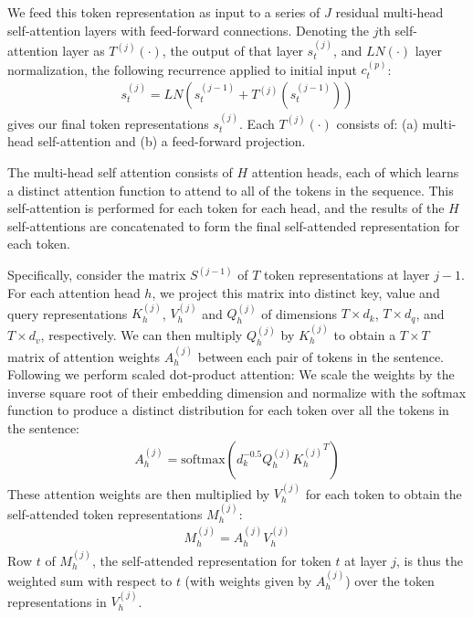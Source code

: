 \documentclass[11pt,a4paper]{article}
\begin{document}
We feed this token representation as input to a series of $J$ residual multi-head self-attention layers with feed-forward connections. Denoting the $j$th self-attention layer as $T^{(j)}(\cdot)$, the output of that layer $s_t^{(j)}$, and $LN(\cdot)$ layer normalization, the following recurrence applied to initial input $c_t^{(p)}$:
\begin{align}
\label{eqn:overall}
s_t^{(j)} = LN(s_t^{(j-1)} + T^{(j)}(s_t^{(j-1)}))
\end{align}
gives our final token representations $s_t^{(j)}$. Each $T^{(j)}(\cdot)$ consists of: (a) multi-head self-attention and (b) a feed-forward projection.

The multi-head self attention consists of $H$ attention heads, each of which learns a distinct attention function to attend to all of the tokens in the sequence. This self-attention is performed for each token for each head, and the results of the $H$ self-attentions are concatenated to form the final self-attended representation for each token. 

Specifically, consider the matrix $S^{(j-1)}$ of $T$ token representations at layer $j-1$. For each attention head $h$, we project this matrix into distinct key, value and query representations $K_h^{(j)}$, $V_h^{(j)}$ and $Q_h^{(j)}$ of dimensions $T\times d_k$, $T\times d_q$, and $T\times d_v$, respectively. We can then multiply $Q_h^{(j)}$ by $K_h^{(j)}$ to obtain a $T\times T$ matrix of attention weights $A_h^{(j)}$ between each pair of tokens in the sentence. Following \citet{vaswani2017attention} we perform scaled dot-product attention: We scale the weights by the inverse square root of their embedding dimension and normalize with the softmax function to produce a distinct distribution for each token over all the tokens in the sentence:
\begin{align}
A_h^{(j)} = \mathrm{softmax}(d_{k}^{-0.5}Q_h^{(j)}{K_h^{(j)}}^T)
\end{align}
These attention weights are then multiplied by $V_h^{(j)}$ for each token to obtain the self-attended token representations $M_h^{(j)}$:
\begin{align}
M_h^{(j)} = A_h^{(j)}V_h^{(j)}
\end{align}
Row $t$ of $M_h^{(j)}$, the self-attended representation for token $t$ at layer $j$, is thus the weighted sum with respect to $t$ (with weights given by $A_h^{(j)}$) over the token representations in $V_h^{(j)}$. 
\end{document}
